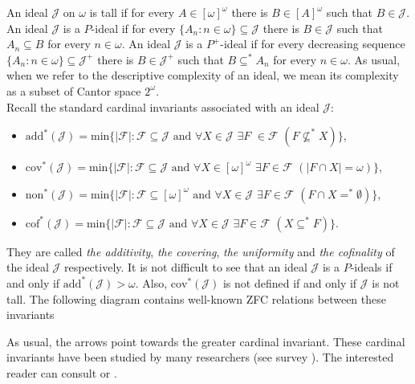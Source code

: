 \documentclass[a4paper]{amsart}
\newcommand{\Cantor}{2^{\omega}}
\newcommand{\add}{\mathrm{add}}
\newcommand{\cof}{\mathrm{cof}}
\newcommand{\cov}{\mathrm{cov}}
\newcommand{\non}{\mathrm{non}}
\newcommand{\J}{\mathcal{J}}
\begin{document}
An ideal $\J$ on $\omega$ is tall if for every $A\in[\omega]^{\omega}$ there is $B\in[A]^{\omega}$ such that $B\in\J$. An ideal $\J$ is a $P$-ideal if for every $\{A_{n}:n\in\omega\}\subseteq\J$ there is $B\in\J$ such that $A_{n}\subseteq B$ for every $n\in\omega$. An ideal $\J$ is a $P^{+}$-ideal if for every decreasing sequence $\{A_{n}:n\in\omega\}\subseteq\J^{+}$ there is $B\in\J^{+}$ such that $B\subseteq^{*}A_{n}$ for every $n\in\omega$. As usual, when we refer to the descriptive complexity of an ideal, we mean its complexity as a subset of Cantor space $\Cantor$.\\

Recall the standard cardinal invariants associated with an ideal $\J$:
\begin{itemize}
    \item[--] $\add^*(\J) = \mathrm{min}\{ |\mathcal{F}| : \mathcal{F} \subseteq \J \text{ and } \forall X \in \J$ $\exists F$ $\in \mathcal{F}$ $(F \nsubseteq^* X) \}$,
    \item[--] $\cov^*(\J) = \mathrm{min}\{ |\mathcal{F}| : \mathcal{F} \subseteq \J \text{ and } \forall X\in[\omega]^{\omega}$ $\exists F \in \mathcal{F}$ $(|F \cap X|=\omega) \}$,
    \item[--] $\non^*(\J) = \mathrm{min}\{ |\mathcal{F}| : \mathcal{F} \subseteq [\omega]^{\omega} \text{ and } \forall X\in\J$ $\exists F \in \mathcal{F}$ $(F \cap X=^*\emptyset) \}$,
    \item[--] $\cof^*(\J) = \mathrm{min}\{ |\mathcal{F}| : \mathcal{F} \subseteq \J \text{ and } \forall X\in\J$ $\exists F \in \mathcal{F}$ $(X \subseteq^{*} F) \}$.
\end{itemize}
They are called \emph{the additivity}, \emph{the covering}, \emph{the uniformity} and \emph{the cofinality} of the ideal $\J$ respectively. It is not difficult to see that an ideal $\J$ is a $P$-ideals if and only if $\add^*(\J)>\omega$. Also, $\cov^{*}(\J)$ is not defined if and only if $\J$ is not tall. The following diagram contains well-known ZFC relations between these invariants
\begin{center}
\end{center}
As usual, the arrows point towards the greater cardinal invariant. These cardinal invariants have been studied by many researchers (see survey \cite{Hrus}). The interested reader can consult \cite{Hrus} or \cite{Meza}.\\
\end{document}
